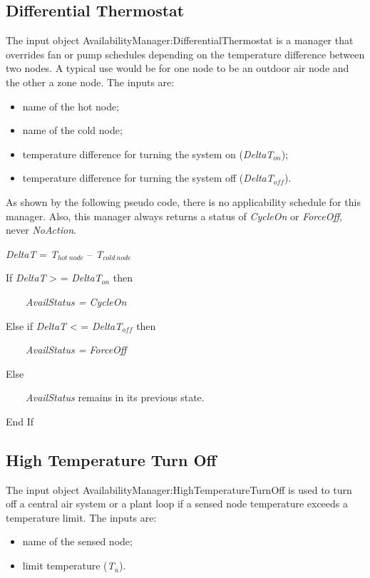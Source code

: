 \subsection{Differential Thermostat}\label{differential-thermostat}

The input object AvailabilityManager:DifferentialThermostat is a manager that overrides fan or pump schedules depending on the temperature difference between two nodes. A typical use would be for one node to be an outdoor air node and the other a zone node. The inputs are:

\begin{itemize}
\item name of the hot node;
\item name of the cold node;
\item temperature difference for turning the system on (\emph{DeltaT\(_{on}\)});
\item temperature difference for turning the system off (\emph{DeltaT\(_{off}\)}).
\end{itemize}

As shown by the following pseudo code, there is no applicability schedule for this manager. Also, this manager always returns a status of \emph{CycleOn} or \emph{ForceOff}, never \emph{NoAction}.

\emph{DeltaT} = \emph{T\(_{hot~node}\)} -- \emph{T\(_{cold~node}\)}

If \emph{DeltaT} \textgreater{} = \emph{DeltaT\(_{on}\)} then

~~~~\emph{AvailStatus = CycleOn}

Else if \emph{DeltaT} \textless{} = \emph{DeltaT\(_{off}\)} then

~~~~\emph{AvailStatus = ForceOff}

Else

~~~~\emph{AvailStatus} remains in its previous state.

End If

\subsection{High Temperature Turn Off}\label{high-temperature-turn-off}

The input object AvailabilityManager:HighTemperatureTurnOff is used to turn off a central air system or a plant loop if a sensed node temperature exceeds a temperature limit. The inputs are:

\begin{itemize}
\item name of the sensed node;
\item limit temperature (\emph{T\(_{u}\)}).
\end{itemize}


